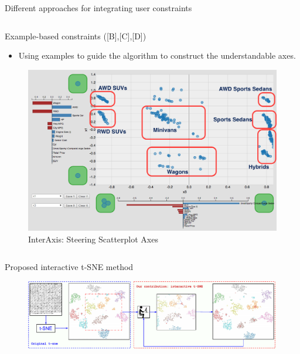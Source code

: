 \documentclass{beamer}
\begin{document}
\begin{frame}[fragile]
\begin{block}{Different approaches for integrating user constraints}
\begin{columns}[T]
\begin{column}{.34\textwidth}
    \begin{block}{Example-based constraints ([B],[C],[D])}
      \begin{itemize}
        \item Using examples to guide the algorithm to construct the understandable axes.
      \end{itemize}
      \begin{figure}[h!]
        \includegraphics[width=\linewidth]{eg_interaxis}
        \caption{InterAxis: Steering Scatterplot Axes \cite{Kim2016InterAxis}}
      \end{figure}
    \end{block}
\end{column}

\end{columns}
\end{block}


\begin{block}{Proposed interactive t-SNE method}
  \begin{figure}[h!]
      \includegraphics[width=\linewidth]{tsnex.pdf}
      \label{fig:pca:stat:move}    
  \end{figure}


\end{block}
\end{frame}
\end{document}
